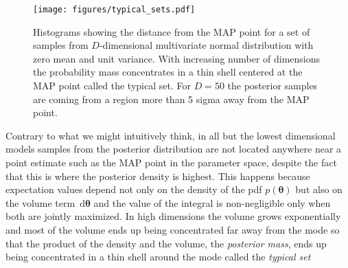 \documentclass[12pt,dvipsnames]{report}
\newcommand{\ud}{\,\mathrm{d}}
\renewcommand{\vec}[1]{\boldsymbol{\mathbf{#1}}}
\begin{document}
%
\begin{figure}[t]
    \begin{centering}
        \texttt{[image: figures/typical\_sets.pdf]}
        \caption{Histograms showing the distance from the MAP point for a set of 
        samples from $D$-dimensional multivariate normal distribution with 
        zero mean and unit variance. With increasing number of dimensions the 
        probability mass concentrates in a thin shell centered at the MAP point 
        called the typical set. For $D=50$ the posterior samples are coming from 
        a region more than 5 sigma away from the MAP point.}     
               \label{fig:typical_sets}
    \end{centering}
\end{figure}
Contrary to what we might intuitively think, in all but the lowest dimensional models
samples from the posterior distribution are not located anywhere 
near a point estimate such as the MAP point in the parameter space, despite the fact 
that this is where the posterior density is highest.
This happens because expectation values  depend not only on the density of the pdf 
$p(\vec\theta)$ but also on the volume term 
$\ud \vec\theta$ and the value of the integral is non-negligible only when both are 
jointly maximized. In high dimensions the volume grows exponentially and most 
of the volume ends up being concentrated far away from the mode so that 
the product of the density and the  volume, the \textsl{posterior mass}, ends up 
being concentrated in a thin shell around the mode called the \textsl{typical set} 
\end{document}

